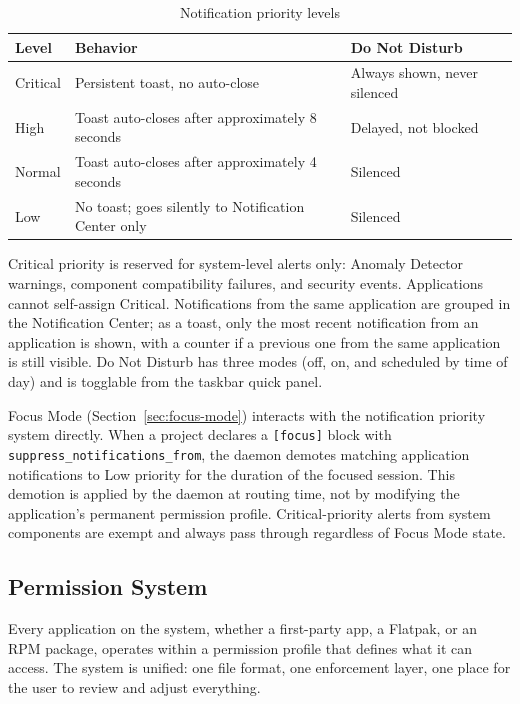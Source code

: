 \begin{table}[htbp]
\caption{Notification priority levels}
\label{tab:notifications}
\begin{tabularx}{\linewidth}{lXX}
\toprule
\textbf{Level} & \textbf{Behavior} & \textbf{Do Not Disturb} \\
\midrule
Critical & Persistent toast, no auto-close &
  Always shown, never silenced \\
High     & Toast auto-closes after approximately 8 seconds &
  Delayed, not blocked \\
Normal   & Toast auto-closes after approximately 4 seconds &
  Silenced \\
Low      & No toast; goes silently to Notification Center only &
  Silenced \\
\bottomrule
\end{tabularx}
\end{table}

Critical priority is reserved for system-level alerts only: Anomaly Detector
warnings, component compatibility failures, and security events. Applications
cannot self-assign Critical. Notifications from the same application are
grouped in the Notification Center; as a toast, only the most recent
notification from an application is shown, with a counter if a previous one
from the same application is still visible. Do Not Disturb has three modes
(off, on, and scheduled by time of day) and is togglable from the taskbar quick
panel.

Focus Mode (Section~\ref{sec:focus-mode}) interacts with the notification
priority system directly. When a project declares a \texttt{[focus]} block
with \texttt{suppress\_notifications\_from}, the daemon demotes matching
application notifications to Low priority for the duration of the focused
session. This demotion is applied by the daemon at routing time, not by
modifying the application's permanent permission profile. Critical-priority
alerts from system components are exempt and always pass through regardless
of Focus Mode state.

\subsection{Permission System}
\label{sec:permissions}

Every application on the system, whether a first-party app, a Flatpak, or an
RPM package, operates within a permission profile that defines what it can
access. The system is unified: one file format, one enforcement layer, one
place for the user to review and adjust everything.

